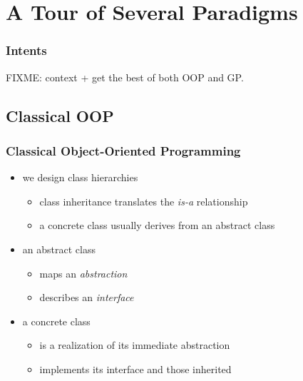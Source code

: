 
\section{A Tour of Several Paradigms}

\begin{frame}
  \frametitle{Intents}

  FIXME: context + get the best of both OOP and GP.

\end{frame}



\subsection{Classical OOP}


\begin{frame}
  \frametitle{Classical Object-Oriented Programming}

  \begin{itemize}
  \item we design class hierarchies
    \begin{itemize}
    \item class inheritance translates the \textit{is-a} relationship
    \item a concrete class usually derives from an abstract class
    \end{itemize}
    \smallskip
  \item an abstract class
    \begin{itemize}
    \item maps an \textit{abstraction}
    \item describes an \textit{interface}
    \end{itemize}
    \smallskip
  \item a concrete class
    \begin{itemize}
    \item is a realization of its immediate abstraction
    \item implements its interface and those inherited
    \end{itemize}
  \end{itemize}

\end{frame}



